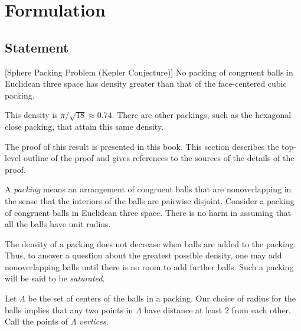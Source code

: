 



\chapter{Formulation}

\section{Statement}



\begin{theorem}[Sphere Packing Problem (Kepler Conjecture)]
\label{theorem:kepler}   No packing of congruent balls in
Euclidean three space has density greater than that of the
face-centered cubic packing.
\end{theorem}

\begin{remark}
This density is $\pi/\sqrt{18}\approx 0.74.$  There are other
packings, such as the hexagonal close packing, that attain this
same density.
\end{remark}

The proof of this result is presented in this book. This section
describes the top-level outline of the proof and gives references to
the sources of the details of the proof.

A {\it packing} means an arrangement of congruent balls that
are nonoverlapping in the sense that the interiors of the balls are
pairwise disjoint. Consider a 
 packing of congruent
balls in Euclidean three space. There is no harm in assuming that
all the balls have unit radius. 

The density of a packing does not
decrease when balls are added to the packing. Thus, to answer a
question about the greatest possible density, one may add
nonoverlapping balls until there is no room to add further balls.
Such a packing will be said to be {\it saturated}.


Let $\Lambda$ be the set of centers of the balls in a
packing. Our choice of radius for the
balls implies that any two points in $\Lambda$ have distance at
least $2$ from each other. Call the points of $\Lambda$ {\it
 vertices}.


